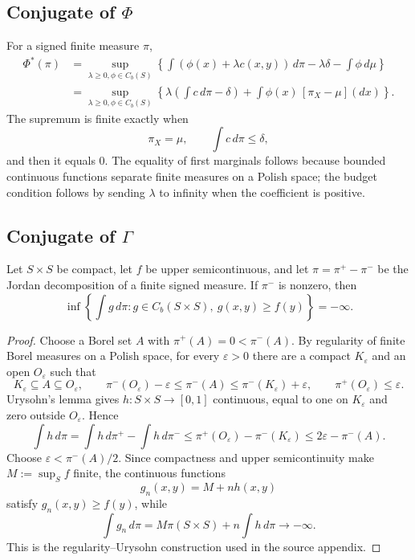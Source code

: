 \subsection{Conjugate of $\Phi$}
For a signed finite measure $\pi$,
\begin{align*}
 \Phi^*(\pi)
 &=\sup_{\lambda\ge0,\phi\in C_b(S)}
 \left\{\int(\phi(x)+\lambda c(x,y))\,d\pi
       -\lambda\delta-\int\phi\,d\mu\right\}\\
 &=\sup_{\lambda\ge0,\phi\in C_b(S)}
 \left\{\lambda\left(\int c\,d\pi-\delta\right)
       +\int\phi(x)\,[\pi_X-\mu](dx)\right\}.
\end{align*}
The supremum is finite exactly when
\[
 \pi_X=\mu,
 \qquad \int c\,d\pi\le\delta,
\]
and then it equals $0$.  The equality of first marginals follows because bounded continuous
functions separate finite measures on a Polish space; the budget condition follows by sending
$\lambda$ to infinity when the coefficient is positive.

\subsection{Conjugate of $\Gamma$}

\begin{lemma}
Let $S\times S$ be compact, let $f$ be upper semicontinuous, and let
$\pi=\pi^+-\pi^-$ be the Jordan decomposition of a finite signed measure.  If $\pi^-$ is nonzero,
then
\[
 \inf\left\{\int g\,d\pi:g\in C_b(S\times S),\ g(x,y)\ge f(y)\right\}=-\infty.
\]
\end{lemma}
\begin{proof}
Choose a Borel set $A$ with $\pi^+(A)=0<\pi^-(A)$.  By regularity of finite Borel measures on a
Polish space, for every $\varepsilon>0$ there are a compact $K_\varepsilon$ and an open
$O_\varepsilon$ such that
\[
 K_\varepsilon\subseteq A\subseteq O_\varepsilon,
 \qquad
 \pi^-(O_\varepsilon)-\varepsilon\le \pi^-(A)
 \le \pi^-(K_\varepsilon)+\varepsilon,
 \qquad
 \pi^+(O_\varepsilon)\le\varepsilon.
\]
Urysohn's lemma gives $h:S\times S\to[0,1]$ continuous, equal to one on $K_\varepsilon$ and zero
outside $O_\varepsilon$.  Hence
\[
 \int h\,d\pi
 =\int h\,d\pi^+-\int h\,d\pi^-
 \le \pi^+(O_\varepsilon)-\pi^-(K_\varepsilon)
 \le 2\varepsilon-\pi^-(A).
\]
Choose $\varepsilon<\pi^-(A)/2$.  Since compactness and upper semicontinuity make
$M:=\sup_S f$ finite, the continuous functions
\[
 g_n(x,y)=M+n h(x,y)
\]
satisfy $g_n(x,y)\ge f(y)$, while
\[
 \int g_n\,d\pi=M\pi(S\times S)+n\int h\,d\pi\longrightarrow-\infty.
\]
This is the regularity--Urysohn construction used in the source appendix.
\end{proof}

